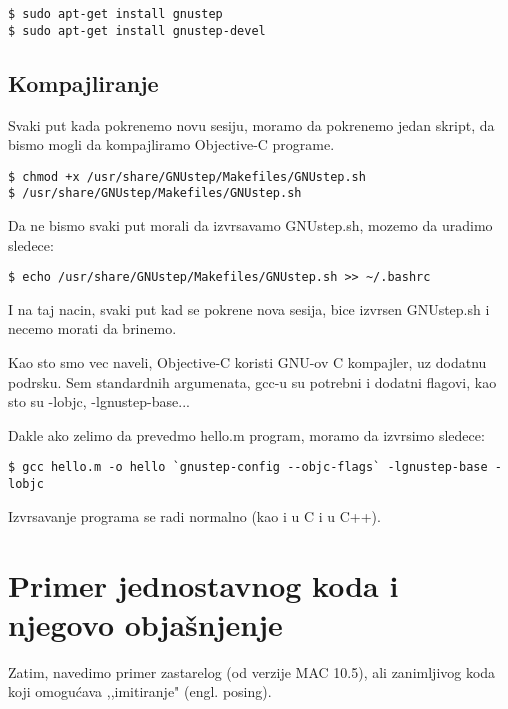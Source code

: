 \documentclass[a4paper]{article}
\begin{document}
\begin{lstlisting}[frame=single]
$ sudo apt-get install gnustep
$ sudo apt-get install gnustep-devel
\end{lstlisting}

\subsection{Kompajliranje}
Svaki put kada pokrenemo novu sesiju, moramo da pokrenemo jedan skript, da bismo mogli da kompajliramo Objective-C programe.
\begin{lstlisting}[frame=single]
$ chmod +x /usr/share/GNUstep/Makefiles/GNUstep.sh
$ /usr/share/GNUstep/Makefiles/GNUstep.sh
\end{lstlisting}

Da ne bismo svaki put morali da izvrsavamo GNUstep.sh, mozemo da uradimo sledece:

\begin{lstlisting}[frame=single]
$ echo /usr/share/GNUstep/Makefiles/GNUstep.sh >> ~/.bashrc
\end{lstlisting}

I na taj nacin, svaki put kad se pokrene nova sesija, bice izvrsen GNUstep.sh i necemo morati da brinemo.

Kao sto smo vec naveli, Objective-C koristi GNU-ov C kompajler, uz dodatnu
podrsku.
Sem standardnih argumenata, gcc-u su potrebni i dodatni flagovi, kao sto su -lobjc, -lgnustep-base...

Dakle ako zelimo da prevedmo hello.m program, moramo da izvrsimo sledece:
\begin{lstlisting}[frame=single]
$ gcc hello.m -o hello `gnustep-config --objc-flags` -lgnustep-base -lobjc
\end{lstlisting}

Izvrsavanje programa se radi normalno (kao i u C i u C++).

\section{Primer jednostavnog koda i njegovo objašnjenje}
\label{sec:primer}

Zatim, navedimo primer zastarelog (od verzije MAC 10.5), ali zanimljivog koda koji omogućava ,,imitiranje" (engl. posing). 
\end{document}
